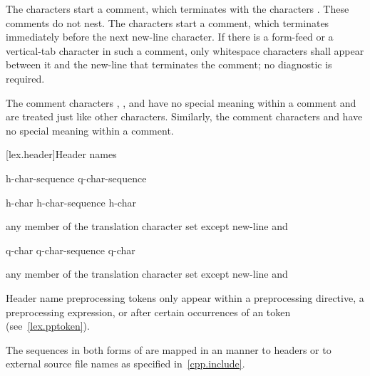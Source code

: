 \pnum
{}%
%
%
The characters \tcode{/*} start a comment, which terminates with the
characters \tcode{*/}. These comments do not nest.
%
The characters \tcode{//} start a comment, which terminates immediately before the
next new-line character. If there is a form-feed or a vertical-tab
character in such a comment, only whitespace characters shall appear
between it and the new-line that terminates the comment; no diagnostic
is required.
\begin{note}
The comment characters \tcode{//}, \tcode{/*},
and \tcode{*/} have no special meaning within a \tcode{//} comment and
are treated just like other characters. Similarly, the comment
characters \tcode{//} and \tcode{/*} have no special meaning within a
\tcode{/*} comment.
\end{note}

[lex.header]{Header names}

%
\begin{bnf}
\obeyspaces
{}\br
    \terminal{<} h-char-sequence \terminal{>}\br
     q-char-sequence 
\end{bnf}

\begin{bnf}
\br
    h-char\br
    h-char-sequence h-char
\end{bnf}

\begin{bnf}
\br
    \textnormal{any member of the translation character set except new-line and }
\end{bnf}

\begin{bnf}
\br
    q-char\br
    q-char-sequence q-char
\end{bnf}

\begin{bnf}
\br
    \textnormal{any member of the translation character set except new-line and }
\end{bnf}

\pnum
\begin{note}
Header name preprocessing tokens only appear within
a  preprocessing directive,
a  preprocessing expression, or
after certain occurrences of an  token
(see~\ref{lex.pptoken}).
\end{note}
The sequences in both forms of  are mapped in an
 manner to headers or to
external source file names as specified in~\ref{cpp.include}.


